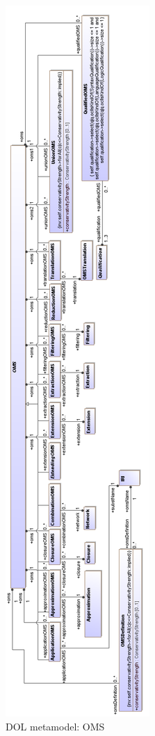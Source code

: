 \documentclass[10pt, a4paper]{isov2}
\begin{document}
\begin{figure}
  \centering

    \includegraphics[scale=0.43]{mof/oms.png}
  \caption{DOL metamodel: OMS}
  \label{fig:oms}
  	
\end{figure}
\end{document}
